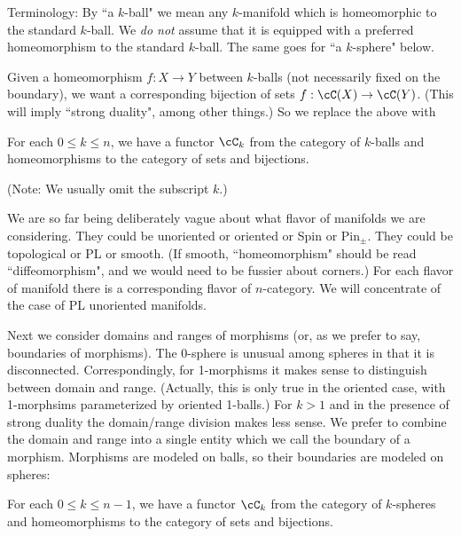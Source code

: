 Terminology: By ``a $k$-ball" we mean any $k$-manifold which is homeomorphic to the 
standard $k$-ball.
We {\it do not} assume that it is equipped with a 
preferred homeomorphism to the standard $k$-ball.
The same goes for ``a $k$-sphere" below.


Given a homeomorphism $f:X\to Y$ between $k$-balls (not necessarily fixed on 
the boundary), we want a corresponding
bijection of sets $f:\cC(X)\to \cC(Y)$.
(This will imply ``strong duality", among other things.)
So we replace the above with

\begin{axiom}[Morphisms]
\label{axiom:morphisms}
For each $0 \le k \le n$, we have a functor $\cC_k$ from 
the category of $k$-balls and 
homeomorphisms to the category of sets and bijections.
\end{axiom}


(Note: We usually omit the subscript $k$.)

We are so far  being deliberately vague about what flavor of manifolds we are considering.
They could be unoriented or oriented or Spin or $\mbox{Pin}_\pm$.
They could be topological or PL or smooth.
(If smooth, ``homeomorphism" should be read ``diffeomorphism", and we would need
to be fussier about corners.)
For each flavor of manifold there is a corresponding flavor of $n$-category.
We will concentrate of the case of PL unoriented manifolds.

Next we consider domains and ranges of morphisms (or, as we prefer to say, boundaries
of morphisms).
The 0-sphere is unusual among spheres in that it is disconnected.
Correspondingly, for 1-morphisms it makes sense to distinguish between domain and range.
(Actually, this is only true in the oriented case, with 1-morphsims parameterized
by oriented 1-balls.)
For $k>1$ and in the presence of strong duality the domain/range division makes less sense.
We prefer to combine the domain and range into a single entity which we call the 
boundary of a morphism.
Morphisms are modeled on balls, so their boundaries are modeled on spheres:

\begin{axiom}
For each $0 \le k \le n-1$, we have a functor $\cC_k$ from 
the category of $k$-spheres and 
homeomorphisms to the category of sets and bijections.
\end{axiom}

